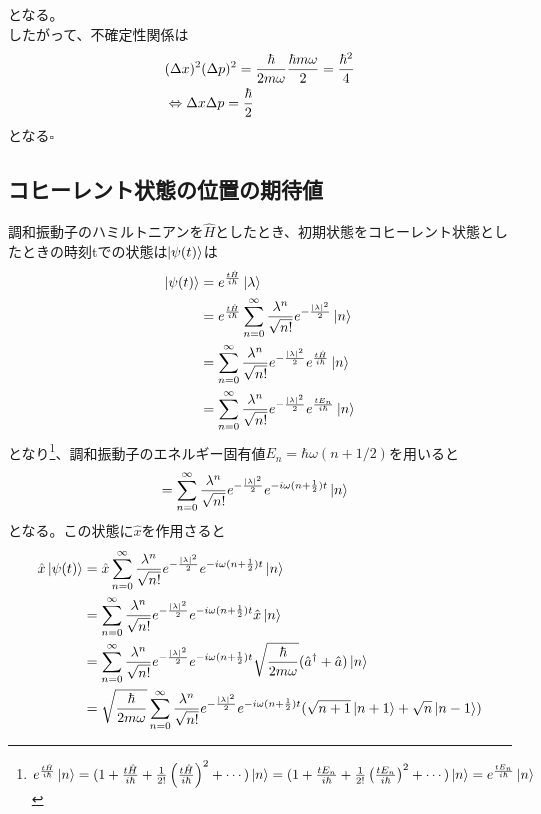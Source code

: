 \documentclass{jsarticle}  %
\numberwithin{equation}{section} %
\numberwithin{figure}{section}
\begin{document}
    となる。\\
    したがって、不確定性関係は
    \begin{align}
        &(\Delta x)^2(\Delta p)^2 =  \frac{\hbar}{2m\omega}\frac{\hbar m\omega}{2} =\frac{\hbar^2}{4} \notag \\
        &\Leftrightarrow \Delta x \Delta p = \frac{\hbar}{2}
    \end{align}
    となる$\square$
\subsection{コヒーレント状態の位置の期待値}
    調和振動子のハミルトニアンを$\hat{H}$としたとき、初期状態をコヒーレント状態としたときの時刻tでの状態は$\ket{\psi(t)}$は
    \begin{align}
        \ket{\psi(t)} &= e^{\frac{t\hat{H}}{i\hbar}} \ket{\lambda} \notag \\
        &= e^{\frac{t\hat{H}}{i\hbar}}\sum_{n=0}^\infty \frac{\lambda^n}{\sqrt{n!}} e^{-\frac{|\lambda|^2}{2} } \ket{n} \notag \\
        &= \sum_{n=0}^\infty \frac{\lambda^n}{\sqrt{n!}} e^{-\frac{|\lambda|^2}{2} } e^{\frac{t\hat{H}}{i\hbar}}\ket{n} \notag \\
        &= \sum_{n=0}^\infty \frac{\lambda^n}{\sqrt{n!}} e^{-\frac{|\lambda|^2}{2} } e^{\frac{tE_n}{i\hbar}}\ket{n}
    \end{align}
    となり\footnote{$e^{\frac{t\hat{H}}{i\hbar}}\ket{n} = (1 + \frac{t\hat{H}}{i\hbar} + \frac{1}{2!} \left( \frac{t\hat{H}}{i\hbar} \right)^2 + \cdots)\ket{n} = (1 + \frac{tE_n}{i\hbar} + \frac{1}{2!} \left( \frac{tE_n}{i\hbar} \right)^2 + \cdots)\ket{n} = e^{\frac{tE_n}{i\hbar}}\ket{n}$}、調和振動子のエネルギー固有値$E_n = \hbar \omega (n + 1/2)$を用いると
    \begin{align}
        &= \sum_{n=0}^\infty \frac{\lambda^n}{\sqrt{n!}} e^{-\frac{|\lambda|^2}{2} } e^{-i\omega(n+\frac{1}{2})t}\ket{n}
    \end{align}
    となる。この状態に$\hat{x}$を作用さると
    \begin{align}
        \hat{x} \ket{\psi(t)} &= \hat{x} \sum_{n=0}^\infty \frac{\lambda^n}{\sqrt{n!}} e^{-\frac{|\lambda|^2}{2} } e^{-i\omega(n+\frac{1}{2})t}\ket{n} \notag \\
        &= \sum_{n=0}^\infty \frac{\lambda^n}{\sqrt{n!}} e^{-\frac{|\lambda|^2}{2} } e^{-i\omega(n+\frac{1}{2})t} \hat{x} \ket{n} \notag \\
        &= \sum_{n=0}^\infty \frac{\lambda^n}{\sqrt{n!}} e^{-\frac{|\lambda|^2}{2} } e^{-i\omega(n+\frac{1}{2})t} \sqrt{\frac{\hbar}{2m\omega}}(\hat{a}^\dagger + \hat{a}) \ket{n} \notag \\
        &= \sqrt{\frac{\hbar}{2m\omega}} \sum_{n=0}^\infty \frac{\lambda^n}{\sqrt{n!}} e^{-\frac{|\lambda|^2}{2} } e^{-i\omega(n+\frac{1}{2})t} (\sqrt{n+1}\ket{n+1} + \sqrt{n}\ket{n-1}) 
    \end{align}
\end{document}
